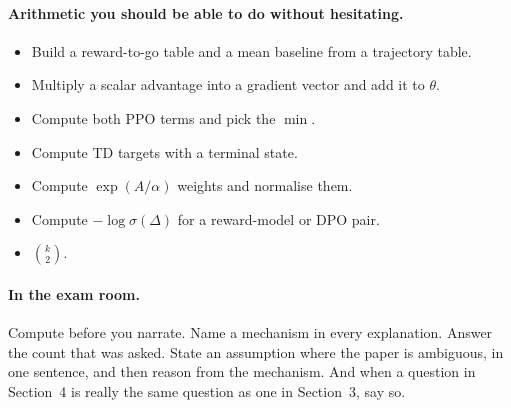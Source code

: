 \documentclass[11pt,a4paper]{article}
\begin{document}
\paragraph{Arithmetic you should be able to do without hesitating.}
\begin{itemize}
\item[$\square$] Build a reward-to-go table and a mean baseline from a
trajectory table.
\item[$\square$] Multiply a scalar advantage into a gradient vector and add it
to $\theta$.
\item[$\square$] Compute both PPO terms and pick the $\min$.
\item[$\square$] Compute TD targets with a terminal state.
\item[$\square$] Compute $\exp(A/\alpha)$ weights and normalise them.
\item[$\square$] Compute $-\log\sigma(\Delta)$ for a reward-model or DPO pair.
\item[$\square$] $\binom{k}{2}$.
\end{itemize}

\paragraph{In the exam room.} Compute before you narrate. Name a mechanism in
every explanation. Answer the count that was asked. State an assumption where
the paper is ambiguous, in one sentence, and then reason from the mechanism.
And when a question in Section~4 is really the same question as one in
Section~3, say so.
\end{document}
